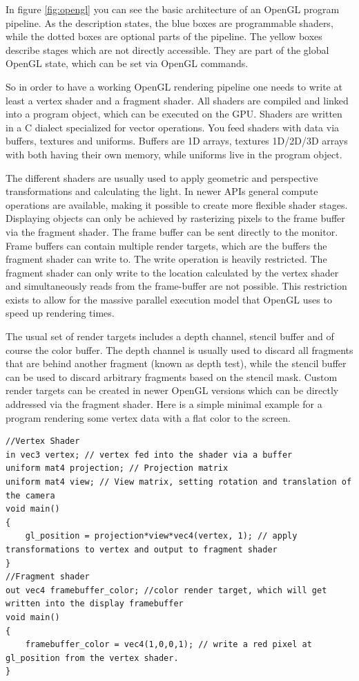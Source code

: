 In figure \ref{fig:opengl} you can see the basic architecture of an OpenGL program pipeline.
As the description states, the blue boxes are programmable shaders, while the dotted boxes are optional parts of the pipeline.
The yellow boxes describe stages which are not directly accessible. They are part of the global OpenGL state, which can be set via OpenGL commands.

So in order to have a working OpenGL rendering pipeline one needs to write at least a vertex shader and a fragment shader.
All shaders are compiled and linked into a program object, which can be executed on the \ac{GPU}.
Shaders are written in a C dialect specialized for vector operations.
You feed shaders with data via buffers, textures and uniforms. Buffers are 1D arrays, textures 1D/2D/3D arrays with both having their own memory, while uniforms live in the program object.

The different shaders are usually used to apply geometric and perspective transformations and calculating the light.
In newer APIs general compute operations are available, making it possible to create more flexible shader stages.
Displaying objects can only be achieved by rasterizing pixels to the frame buffer via the fragment shader.
The frame buffer can be sent directly to the monitor.
Frame buffers can contain multiple render targets, which are the buffers the fragment shader can write to.
The write operation is heavily restricted. The fragment shader can only write to the location calculated by the vertex shader and simultaneously reads from the frame-buffer are not possible. 
This restriction exists to allow for the massive parallel execution model that OpenGL uses to speed up rendering times.

The usual set of render targets includes a depth channel, stencil buffer and of course the color buffer.
The depth channel is usually used to discard all fragments that are behind another fragment (known as depth test), while the stencil buffer can be used to discard arbitrary fragments based on the stencil mask. 
Custom render targets can be created in newer OpenGL versions which can be directly addressed via the fragment shader.
Here is a simple minimal example for a program rendering some vertex data with a flat color to the screen.

\begin{lstlisting}
//Vertex Shader
in vec3 vertex; // vertex fed into the shader via a buffer
uniform mat4 projection; // Projection matrix
uniform mat4 view; // View matrix, setting rotation and translation of the camera
void main()
{
    gl_position = projection*view*vec4(vertex, 1); // apply transformations to vertex and output to fragment shader
}
//Fragment shader
out vec4 framebuffer_color; //color render target, which will get written into the display framebuffer
void main()
{
    framebuffer_color = vec4(1,0,0,1); // write a red pixel at gl_position from the vertex shader.
}
\end{lstlisting}

